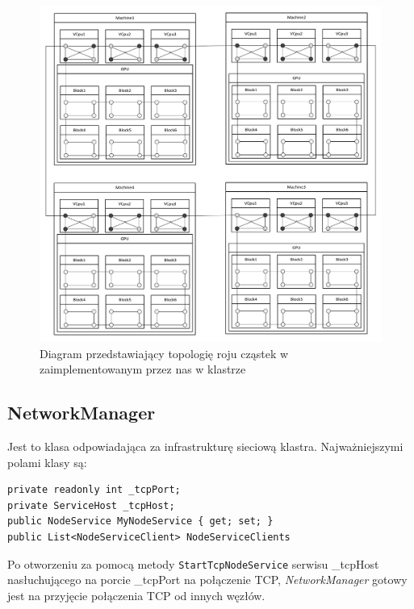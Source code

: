\documentclass[12pt, twoside, openany, abstract=on]{report}
\theoremstyle{definition}
\begin{document}
\begin{figure}[H]
    \centering
    \includegraphics[scale=0.5]{wholeClusterNew.pdf} 
 \caption{Diagram przedstawiający topologię roju cząstek w zaimplementowanym przez nas w klastrze}
 \label{fig:wholeCluster}
\end{figure}


\subsection{NetworkManager}
Jest to klasa odpowiadająca za infrastrukturę sieciową klastra. Najważniejszymi polami klasy są:

\lstset{style=sharpc}
\begin{lstlisting}[frame=single]
private readonly int _tcpPort;
private ServiceHost _tcpHost;
public NodeService MyNodeService { get; set; }
public List<NodeServiceClient> NodeServiceClients
\end{lstlisting}

Po otworzeniu za pomocą metody \texttt{StartTcpNodeService} serwisu \_tcpHost nasłuchującego na porcie \_tcpPort na połączenie TCP, \textit{NetworkManager} gotowy jest na przyjęcie połączenia TCP od innych węzłów. 
\end{document}
